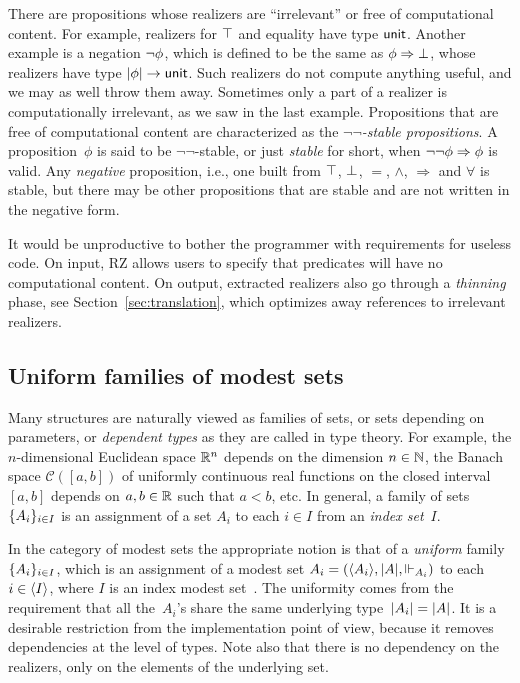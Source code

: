 \iflong
There are propositions whose realizers are ``irrelevant'' or free of
computational content. For example, realizers for $\top$ and
equality have type $\mathsf{unit}$. Another example is a negation
$\lnot \phi$, which is defined to be the same as
$\phi\Rightarrow \bot$, whose realizers have type
$|\phi| \to \mathsf{unit}$. Such realizers do not compute
anything useful, and we may as well throw them away. Sometimes only a
part of a realizer is computationally irrelevant, as we saw in the
last example. Propositions that are free of computational content
are characterized as the \emph{$\lnot\lnot$-stable propositions}. A
proposition~$\phi$ is said to be $\lnot\lnot$-stable, or just
\emph{stable} for short, when $\lnot \lnot \phi\Rightarrow \phi$ is
valid. Any \emph{negative} proposition, i.e., one built from $\top$,
$\bot$, $=$, $\land$, $\Rightarrow$ and $\forall$ is stable, but
there may be other propositions that are stable and are not written
in the negative form.

It would be unproductive to bother the programmer with requirements
for useless code.  On input, RZ allows users to specify that  
predicates will have no computational content.  On output, extracted
realizers also go through a \emph{thinning} phase, see Section~\ref{sec:translation}, which
optimizes away references to irrelevant realizers.
\fi

\subsection{Uniform families of modest sets}
\label{sec:uniform-families}

Many structures are naturally viewed as families of sets, or sets
depending on parameters, or \emph{dependent types} as they are called
in type theory. For example, the $n$-dimensional Euclidean space
$\mathbb{R}^n$ depends on the dimension $n \in \mathbb{N}$, the Banach space
$\mathcal{C}([a,b])$ of uniformly continuous real functions on the
closed interval $[a,b]$ depends on $a, b \in \mathbb{R}$ such that $a < b$,
etc. In general, a family of sets $\{A_i\}_{i \in I}$ is an
assignment of a set $A_i$ to each $i \in I$ from an \emph{index
  set}~$I$.

In the category of modest sets the appropriate notion is that of a
\emph{uniform} family~$\{A_i\}_{i \in I}$, which is an assignment
of a modest set $A_i = (\langle A_i \rangle, |A|, {\Vdash_{A_i}})$ to each
$i \in \langle I \rangle$, where $I$ is an index modest
set~\cite[6.3]{JacobsB:cltt}. The uniformity comes from the
requirement that all the~$A_i$'s share the same underlying
type~$|A_i| = |A|$. It is a desirable restriction from
the implementation point of view, because it removes dependencies at
the level of types. Note also that there is no dependency on the
realizers, only on the elements of the underlying set.


